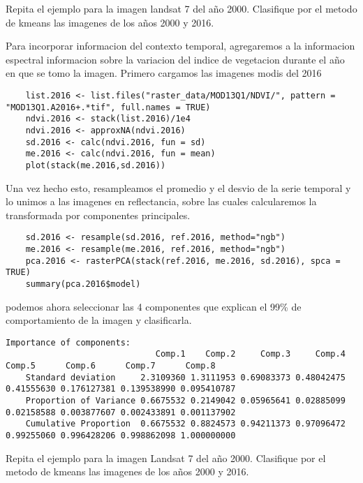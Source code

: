 \begin{act}
  Repita el ejemplo para la imagen landsat 7 del año 2000. Clasifique por el metodo de kmeans las imagenes de los años 2000 y 2016.
\end{act}

\begin{exa}
  Para incorporar informacion del contexto temporal, agregaremos a la informacion
  espectral informacion sobre la variacion del indice de vegetacion durante el
  año en que se tomo la imagen. Primero cargamos las imagenes modis del 2016

  \begin{lstlisting}
    list.2016 <- list.files("raster_data/MOD13Q1/NDVI/", pattern = "MOD13Q1.A2016+.*tif", full.names = TRUE)
    ndvi.2016 <- stack(list.2016)/1e4
    ndvi.2016 <- approxNA(ndvi.2016)
    sd.2016 <- calc(ndvi.2016, fun = sd)
    me.2016 <- calc(ndvi.2016, fun = mean)
    plot(stack(me.2016,sd.2016))
  \end{lstlisting}

  Una vez hecho esto, resampleamos el promedio y el desvio de la serie temporal
  y lo unimos a las imagenes en reflectancia, sobre las cuales calcularemos
  la transformada por componentes principales.

  \begin{lstlisting}
    sd.2016 <- resample(sd.2016, ref.2016, method="ngb")
    me.2016 <- resample(me.2016, ref.2016, method="ngb")
    pca.2016 <- rasterPCA(stack(ref.2016, me.2016, sd.2016), spca = TRUE)
    summary(pca.2016$model)
  \end{lstlisting}

  podemos ahora seleccionar las 4 componentes que explican el 99\% de comportamiento de la imagen y clasificarla.

  \begin{Verbatim}[fontsize=\small]
    Importance of components:
                              Comp.1    Comp.2     Comp.3     Comp.4     Comp.5      Comp.6      Comp.7      Comp.8
    Standard deviation     2.3109360 1.3111953 0.69083373 0.48042475 0.41555630 0.176127381 0.139538990 0.095410787
    Proportion of Variance 0.6675532 0.2149042 0.05965641 0.02885099 0.02158588 0.003877607 0.002433891 0.001137902
    Cumulative Proportion  0.6675532 0.8824573 0.94211373 0.97096472 0.99255060 0.996428206 0.998862098 1.000000000
  \end{Verbatim}
\end{exa}

\begin{act}
  Repita el ejemplo para la imagen Landsat 7 del año 2000. Clasifique por el metodo de kmeans las imagenes de los años 2000 y 2016.
\end{act}
